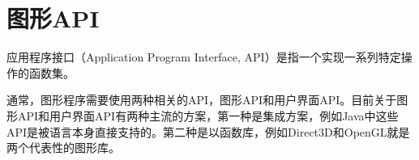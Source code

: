 \section{图形API}
应用程序接口（Application Program Interface, API）是指一个实现一系列特定操作的函数集。

通常，图形程序需要使用两种相关的API，图形API和用户界面API。目前关于图形API和用户界面API有两种主流的方案，第一种是集成方案，例如Java中这些API是被语言本身直接支持的。第二种是以函数库，例如Direct3D和OpenGL就是两个代表性的图形库。